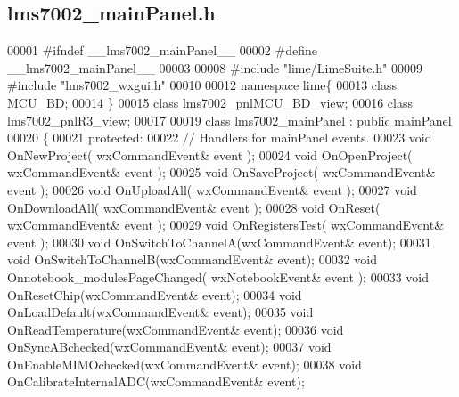 \subsection{lms7002\+\_\+main\+Panel.\+h}
\label{lms7002__mainPanel_8h_source}

\begin{DoxyCode}
00001 \textcolor{preprocessor}{#ifndef \_\_lms7002\_mainPanel\_\_}
00002 \textcolor{preprocessor}{#define \_\_lms7002\_mainPanel\_\_}
00003 
00008 \textcolor{preprocessor}{#include "lime/LimeSuite.h"}
00009 \textcolor{preprocessor}{#include "lms7002_wxgui.h"}
00010 
00012 \textcolor{keyword}{namespace }lime\{
00013 \textcolor{keyword}{class }MCU\_BD;
00014 \}
00015 \textcolor{keyword}{class }lms7002_pnlMCU_BD_view;
00016 \textcolor{keyword}{class }lms7002_pnlR3_view;
00017 
00019 \textcolor{keyword}{class }lms7002_mainPanel : \textcolor{keyword}{public} mainPanel
00020 \{
00021     \textcolor{keyword}{protected}:
00022         \textcolor{comment}{// Handlers for mainPanel events.}
00023         \textcolor{keywordtype}{void} OnNewProject( wxCommandEvent& event );
00024         \textcolor{keywordtype}{void} OnOpenProject( wxCommandEvent& event );
00025         \textcolor{keywordtype}{void} OnSaveProject( wxCommandEvent& event );
00026         \textcolor{keywordtype}{void} OnUploadAll( wxCommandEvent& event );
00027         \textcolor{keywordtype}{void} OnDownloadAll( wxCommandEvent& event );
00028         \textcolor{keywordtype}{void} OnReset( wxCommandEvent& event );
00029         \textcolor{keywordtype}{void} OnRegistersTest( wxCommandEvent& event );
00030         \textcolor{keywordtype}{void} OnSwitchToChannelA(wxCommandEvent& event);
00031         \textcolor{keywordtype}{void} OnSwitchToChannelB(wxCommandEvent& event);
00032         \textcolor{keywordtype}{void} Onnotebook\_modulesPageChanged( wxNotebookEvent& event );
00033         \textcolor{keywordtype}{void} OnResetChip(wxCommandEvent& event);
00034         \textcolor{keywordtype}{void} OnLoadDefault(wxCommandEvent& event);
00035         \textcolor{keywordtype}{void} OnReadTemperature(wxCommandEvent& event);
00036         \textcolor{keywordtype}{void} OnSyncABchecked(wxCommandEvent& event);
00037         \textcolor{keywordtype}{void} OnEnableMIMOchecked(wxCommandEvent& event);
00038         \textcolor{keywordtype}{void} OnCalibrateInternalADC(wxCommandEvent& event);

\end{DoxyCode}
